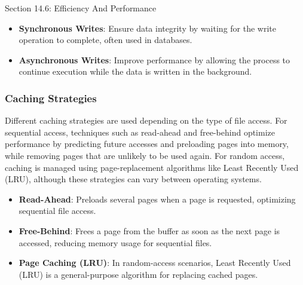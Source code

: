 \begin{notes}{Section 14.6: Efficiency And Performance}
    \begin{highlight}
    
        \begin{itemize}
            \item \textbf{Synchronous Writes}: Ensure data integrity by waiting for the write operation to complete, often used in databases.
            \item \textbf{Asynchronous Writes}: Improve performance by allowing the process to continue execution while the data is written in the background.
        \end{itemize}
    
    \end{highlight}
    
    \subsubsection*{Caching Strategies}
    
    Different caching strategies are used depending on the type of file access. For sequential access, techniques such as read-ahead and free-behind optimize performance by predicting future accesses 
    and preloading pages into memory, while removing pages that are unlikely to be used again. For random access, caching is managed using page-replacement algorithms like Least Recently Used (LRU), 
    although these strategies can vary between operating systems.
    
    \begin{highlight}
    
        \begin{itemize}
            \item \textbf{Read-Ahead}: Preloads several pages when a page is requested, optimizing sequential file access.
            \item \textbf{Free-Behind}: Frees a page from the buffer as soon as the next page is accessed, reducing memory usage for sequential files.
            \item \textbf{Page Caching (LRU)}: In random-access scenarios, Least Recently Used (LRU) is a general-purpose algorithm for replacing cached pages.
        \end{itemize}
    
    \end{highlight}
    
    \begin{highlight}
    

\end{highlight}
\end{notes}
